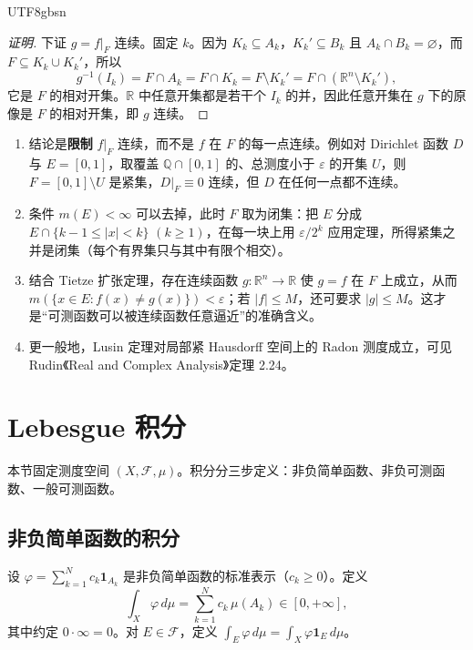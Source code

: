 \documentclass[11pt]{article}
\makeatletter
\newcommand{\envlabel}[1]{\protected@edef\@currentlabel{\themathenv}\label{#1}}
\makeatother
\begin{document}
\begin{CJK*}{UTF8}{gbsn}
\begin{proof}[证明]
下证 $g=f|_{F}$ 连续。固定 $k$。因为 $K_{k}\subseteq A_{k}$，$K_{k}'\subseteq B_{k}$ 且 $A_{k}\cap B_{k}=\varnothing$，而 $F\subseteq K_{k}\cup K_{k}'$，所以
\[
g^{-1}(I_{k})=F\cap A_{k}=F\cap K_{k}=F\setminus K_{k}'=F\cap(\mathbb{R}^{n}\setminus K_{k}'),
\]
它是 $F$ 的相对开集。$\mathbb{R}$ 中任意开集都是若干个 $I_{k}$ 的并，因此任意开集在 $g$ 下的原像是 $F$ 的相对开集，即 $g$ 连续。
\end{proof}

\begin{remark}\envlabel{zh:rem:lusin}
\leavevmode
\begin{enumerate}
  \item 结论是\textbf{限制} $f|_{F}$ 连续，而不是 $f$ 在 $F$ 的每一点连续。例如对 Dirichlet 函数 $D$ 与 $E=[0,1]$，取覆盖 $\mathbb{Q}\cap[0,1]$ 的、总测度小于 $\varepsilon$ 的开集 $U$，则 $F=[0,1]\setminus U$ 是紧集，$D|_{F}\equiv0$ 连续，但 $D$ 在任何一点都不连续。
  \item 条件 $m(E)<\infty$ 可以去掉，此时 $F$ 取为闭集：把 $E$ 分成 $E\cap\{k-1\leq|x|<k\}$ $(k\geq1)$，在每一块上用 $\varepsilon/2^{k}$ 应用定理，所得紧集之并是闭集（每个有界集只与其中有限个相交）。
  \item 结合 Tietze 扩张定理，存在连续函数 $g:\mathbb{R}^{n}\to\mathbb{R}$ 使 $g=f$ 在 $F$ 上成立，从而 $m(\{x\in E:f(x)\neq g(x)\})<\varepsilon$；若 $|f|\leq M$，还可要求 $|g|\leq M$。这才是“可测函数可以被连续函数任意逼近”的准确含义。
  \item 更一般地，Lusin 定理对局部紧 Hausdorff 空间上的 Radon 测度成立，可见 Rudin《Real and Complex Analysis》定理 2.24。
\end{enumerate}
\end{remark}

\section{Lebesgue 积分}

本节固定测度空间 $(X,\mathcal{F},\mu)$。积分分三步定义：非负简单函数、非负可测函数、一般可测函数。

\subsection{非负简单函数的积分}

\begin{definition}
设 $\varphi=\sum_{k=1}^{N}c_{k}\mathbf{1}_{A_{k}}$ 是非负简单函数的标准表示（$c_{k}\geq0$）。定义
\[
\int_{X}\varphi\,d\mu=\sum_{k=1}^{N}c_{k}\,\mu(A_{k})\in[0,+\infty],
\]
其中约定 $0\cdot\infty=0$。对 $E\in\mathcal{F}$，定义 $\int_{E}\varphi\,d\mu=\int_{X}\varphi\mathbf{1}_{E}\,d\mu$。
\end{definition}


\end{CJK*}
\end{document}
